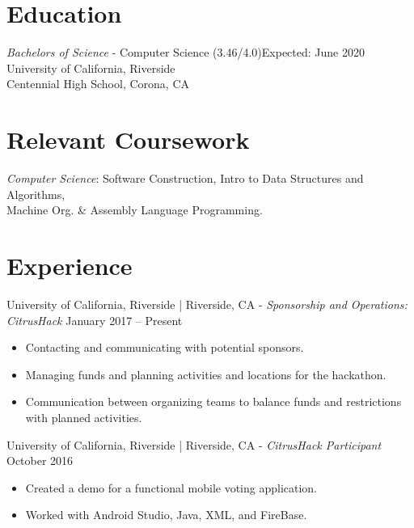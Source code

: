 \documentclass[letter]{res}
\begin{document}
\address{ (951) 318-2818\\ 
  \texttt{sshar032@ucr.edu}\\}
\address{
  \texttt{856 Pheasant St }\\ 
  \texttt{Corona, California, 92881 }\\} 
\begin{resume}
  \noindent\makebox[\linewidth]{\rule{\paperwidth}{.05pt}}

\section{Education}
{\sl Bachelors of Science} - Computer Science (3.46/4.0)\hfill Expected: June 2020\\
University of California, Riverside \\
Centennial High School, Corona, CA
  \vspace{-2mm}
\section{Relevant Coursework}
  {\sl Computer Science}: Software Construction, Intro to Data Structures and Algorithms, \\
  	   Machine Org. \& Assembly Language Programming.\\

\section{Experience}
University of California, Riverside | Riverside, CA \newline
 - {\sl Sponsorship and Operations: CitrusHack} \hfill January 2017 – Present\\
 \vspace{-2mm}
 \begin{itemize}
 \item Contacting and communicating with potential sponsors.
 \item Managing funds and planning activities and locations for the hackathon.
 \item Communication between organizing teams to balance funds and restrictions with planned activities.
 \end{itemize}
   \vspace{-2mm}

University of California, Riverside | Riverside, CA \newline - {\sl CitrusHack Participant} \hfill October 2016\\
  \vspace{-2mm}
  \begin{itemize}
  \item Created a demo for a functional mobile voting application.
  \item Worked with Android Studio, Java, XML, and FireBase.
  \end{itemize}
    \vspace{-2mm}


\end{resume}
\end{document}
